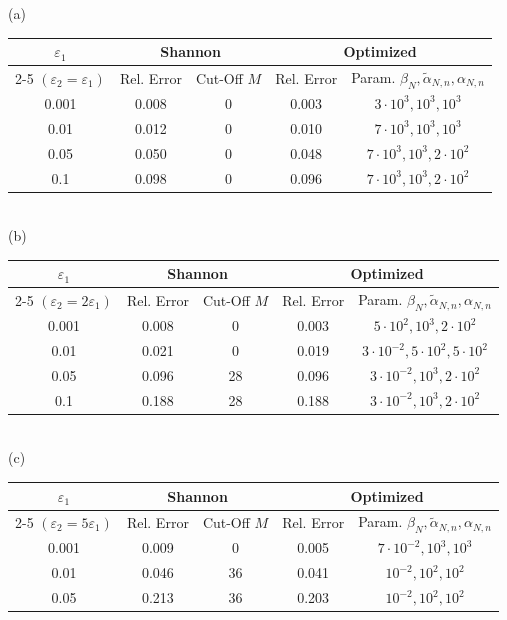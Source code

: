 \documentclass[a4paper, 10pt]{article}
\numberwithin{equation}{section}
\theoremstyle{definition}
\begin{document}
\begin{table}
    (a) \,\,\begin{tabular}{ | c || c | c || c | c | }
   \hline
	$\varepsilon_1$ & \multicolumn{2}{|c||}{Shannon} &\multicolumn{2}{|c|}{Optimized}\\ \cline{2-5}
	$(\varepsilon_2=\varepsilon_1)$ &  Rel. Error & Cut-Off $M$ & Rel. Error & Param. $\beta_N,\tilde{\alpha}_{N,n},\alpha_{N,n}$\\\hline
  0.001& 0.008 & 0 & 0.003 & $3\cdot 10^3, 10^3, 10^3$\\
  0.01 & 0.012& 0 & 0.010 & $7\cdot 10^3, 10^3, 10^3$\\
	0.05 & 0.050 & 0 & 0.048 & $7\cdot 10^3, 10^3, 2\cdot10^2$ \\
	0.1 & 0.098 & 0 & 0.096& $7\cdot 10^3, 10^3,2\cdot10^2$\\
	\hline
\end{tabular}\\[2ex]
 (b) \,\,\begin{tabular}{ | c || c | c || c | c | }
   \hline
	$\varepsilon_1$ & \multicolumn{2}{|c||}{Shannon} &\multicolumn{2}{|c|}{Optimized}\\ \cline{2-5}
	$(\varepsilon_2=2\varepsilon_1)$ &  Rel. Error & Cut-Off $M$ & Rel. Error & Param. $\beta_N,\tilde{\alpha}_{N,n},\alpha_{N,n}$\\\hline
  0.001 & 0.008 & 0 & 0.003& $5\cdot 10^2, 10^3, 2\cdot10^2$\\
  0.01 & 0.021 & 0 & 0.019& $3\cdot 10^{-2}, 5\cdot 10^2, 5\cdot 10^2$\\
	0.05 & 0.096 & 28 & 0.096 & $3\cdot 10^{-2}, 10^3, 2\cdot 10^2$ \\
	0.1 & 0.188 & 28 & 0.188& $3\cdot 10^{-2}, 10^3, 2\cdot 10^2$\\
	\hline
\end{tabular}\\[2ex]
 (c) \,\,\begin{tabular}{ | c || c | c || c | c | }
   \hline
	$\varepsilon_1$ & \multicolumn{2}{|c||}{Shannon} &\multicolumn{2}{|c|}{Optimized}\\ \cline{2-5}
	$(\varepsilon_2=5\varepsilon_1)$ &  Rel. Error & Cut-Off $M$ & Rel. Error & Param. $\beta_N,\tilde{\alpha}_{N,n},\alpha_{N,n}$\\\hline
  0.001 & 0.009 & 0 & 0.005& $7\cdot 10^{-2}, 10^3, 10^3$\\
  0.01 & 0.046 & 36 & 0.041& $10^{-2}, 10^2, 10^2$\\
	0.05 & 0.213 & 36 & 0.203 &  $10^{-2}, 10^2, 10^2$ \\

\end{tabular}
\end{table}
\end{document}
